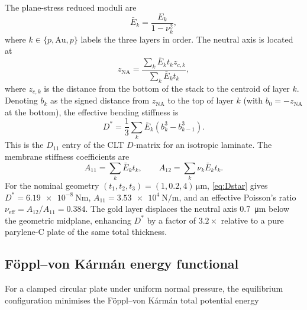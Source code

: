 \documentclass[review,12pt]{elsarticle}
\begin{document}
The plane-stress reduced moduli are
\begin{equation}
    \bar{E}_k = \frac{E_k}{1 - \nu_k^2},
    \label{eq:reduced_modulus}
\end{equation}
where $k \in \{p, \mathrm{Au}, p\}$ labels the three layers in order.  The
neutral axis is located at
\begin{equation}
    z_\mathrm{NA} = \frac{\sum_k \bar{E}_k t_k z_{c,k}}{\sum_k \bar{E}_k t_k},
    \label{eq:neutral_axis}
\end{equation}
where $z_{c,k}$ is the distance from the bottom of the stack to the centroid
of layer $k$. Denoting $b_k$ as the signed distance from $z_\mathrm{NA}$ to
the top of layer $k$ (with $b_0 = -z_\mathrm{NA}$ at the bottom), the
effective bending stiffness is~\cite{atik2020}
\begin{equation}
    D^* = \frac{1}{3}\sum_k \bar{E}_k \left(b_k^3 - b_{k-1}^3\right).
    \label{eq:Dstar}
\end{equation}
This is the $D_{11}$ entry of the CLT $D$-matrix for an isotropic laminate.
The membrane stiffness coefficients are
\begin{equation}
    A_{11} = \sum_k \bar{E}_k t_k, \qquad
    A_{12} = \sum_k \nu_k \bar{E}_k t_k.
    \label{eq:A11A12}
\end{equation}
For the nominal geometry $(t_1, t_2, t_3) = (1, 0.2, 4)\,\si{\micro\metre}$,
\cref{eq:Dstar} gives $D^* = \SI{6.19e-8}{\newton\metre}$,
$A_{11} = \SI{3.53e4}{\newton\per\metre}$, and an effective Poisson's ratio
$\nu_\mathrm{eff} = A_{12}/A_{11} = 0.384$. The gold layer displaces the
neutral axis \SI{0.7}{\micro\metre} below the geometric midplane, enhancing
$D^*$ by a factor of $3.2\times$ relative to a pure parylene-C plate of the
same total thickness.

\subsection{Föppl–von Kármán energy functional}
\label{sec:fvk}

For a clamped circular plate under uniform normal pressure, the equilibrium
configuration minimises the Föppl–von Kármán total potential energy
\cite{timoshenko1959,atik2020}
\end{document}
